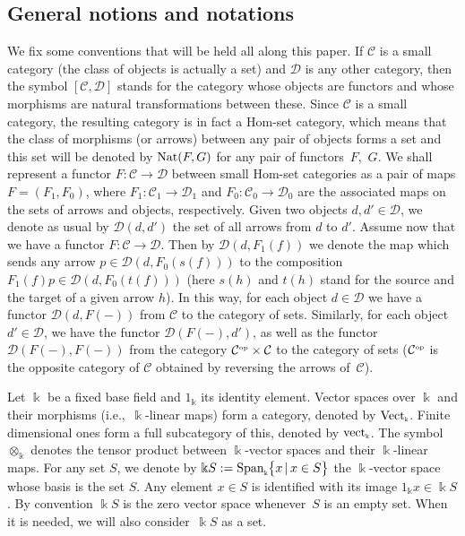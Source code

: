 \documentclass[pdftex]{sigma}
\numberwithin{equation}{section}
\newcommand{\tensor}[1]{\otimes_{\scriptscriptstyle{#1}}}
\newcommand{\Vect}{{\rm Vect}_{\Sscript{\Bbbk}}}
\newcommand{\vect}{{\rm vect}_{\Sscript{\Bbbk}}}
\newcommand{\Co}{\mathcal{C}_{\Sscript{0}}}
\newcommand{\Ca}{\mathcal{C}_{\Sscript{1}}}
\newcommand{\Do}{\cD_{\Sscript{0}}}
\newcommand{\Da}{\cD_{\Sscript{1}}}
\newcommand{\Fo}{F_{\Sscript{0}}}
\newcommand{\Fa}{F_{\Sscript{1}}}
\newcommand{\cD}{{\mathcal D}}
\newcommand{\Sscript}[1]{\scriptscriptstyle{#1}}
\begin{document}
\vspace{-1.2mm}

\subsection{General notions and notations}\label{ssec:notation}

We fix some conventions that will be held all along this paper. If $\mathcal{C}$ is a small category (the class of objects is actually a set) and $\cD$ is any other category, then the symbol $[\mathcal{C}, \cD]$ stands for the category whose objects are functors and whose morphisms are natural transformations between these. Since $\mathcal{C}$ is a small category, the resulting category is in fact a Hom-set category, which means that the class of morphisms (or arrows) between any pair of objects forms a set and this set will be denoted by ${\rm Nat}(F,G)$ for any pair of functors~$F$,~$G$. We shall represent a functor $F \colon \mathcal{C} \to \cD$ between small Hom-set categories as a pair of maps $F=(\Fa,\Fo)$, where $\Fa\colon \Ca \to \Da$ and $\Fo\colon \Co \to \Do$ are the associated maps on the sets of arrows and objects, respectively. Given two objects $d,d' \in \cD$, we denote as usual by $\cD(d,d')$ the set of all arrows from $d$ to $d'$. Assume now that we have a functor $F\colon \mathcal{C} \to \cD$. Then by $\cD(d,\Fa(f))$ we denote the map which sends any arrow $p \in \cD(d, F_{\Sscript{0}}(s(f)))$ to the composition $\Fa(f)p \in \cD(d,F_{\Sscript{0}}(t(f)))$ (here $s(h)$ and $t(h)$ stand for the source and the target of a given arrow $h$). In this way, for each object $d \in \cD$ we have a functor $\cD(d,F(-))$ from $\mathcal{C}$ to the category of sets. Similarly, for each object $d' \in \cD$, we have the functor $\cD(F(-), d')$, as well as the functor $\cD(F(-), F(-))$ from the category $\mathcal{C}^{\Sscript{\rm op}} \times \mathcal{C}$ to the category of sets ($\mathcal{C}^{\Sscript{\rm op}}$ is the opposite category of $\mathcal{C}$ obtained by reversing the arrows of~$\mathcal{C}$).

Let $\Bbbk$ be a fixed base field and $1_{\Sscript{\Bbbk}}$ its identity element. Vector spaces over $\Bbbk$ and their morphisms (i.e.,~$\Bbbk$-linear maps) form a category, denoted by $\Vect$. Finite dimensional ones form a full subcategory of this, denoted by $\vect$. The symbol $\tensor{\Bbbk}$ denotes the tensor product between $\Bbbk$-vector spaces and their $\Bbbk$-linear maps. For any set $S$, we denote by $\Bbbk S:={\rm Span}_{\Sscript{\Bbbk}}\big\{x \,|\, x \in S \big\}$ the $\Bbbk$-vector space whose basis is the set $S$. Any element $x \in S$ is identified with its image $1_{\Sscript{\Bbbk}} x \in \Bbbk S$. By convention $\Bbbk S$ is the zero vector space whenever~$S$ is an empty set. When it is needed, we will also consider~$\Bbbk S$ as a set.
\end{document}
